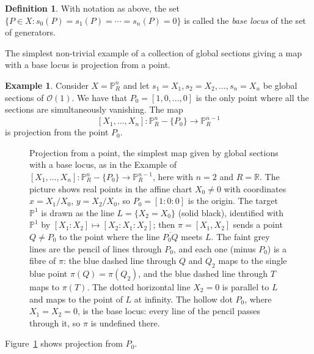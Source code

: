 \documentclass[12pt]{article}
\numberwithin{equation}{section}
\theoremstyle{definition}
\newtheorem{definition}[theorem]{Definition}
\newtheorem{example}[theorem]{Example}
\theoremstyle{remark}
\newcommand{\RR}{\mathbb{R}}
\newcommand{\Ocal}{\mathcal{O}}
\newcommand{\PP}{\mathbb{P}}
\begin{document}
\begin{definition}
	With notation as above, the set $\lbrace P \in X \colon s_0(P)=s_1(P)=\cdots =s_n(P) =0 \rbrace $ is called the \emph{base locus} of the set of generators.
\end{definition}


The simplest non-trivial example of a collection of global sections giving a map with a base locus is projection from a point. 
\begin{example}
	Consider $X = \PP^n_R$ and let $s_1 = X_1, s_2=X_2, \ldots, s_n = X_n$ be global sections of $\Ocal(1)$.
	We have that $P_0 = [1,0,\ldots,0]$ is the only point where all the sections are simultaneously vanishing. 
	The map 
	$$ [X_1,\ldots,X_n] \colon \PP^n_R - \lbrace P_0 \rbrace \to \PP^{n-1}_R $$
	is projection from the point $P_0$.
\end{example}
\begin{figure}[H]
\centering

\caption{Projection from a point, the simplest map given by global sections with a base locus, as in the Example of $[X_1,\ldots,X_n]\colon\PP^n_R-\{P_0\}\to\PP^{n-1}_R$, here with $n=2$ and $R=\RR$. The picture shows real points in the affine chart $X_0\neq0$ with coordinates $x=X_1/X_0$, $y=X_2/X_0$, so $P_0=[1{:}0{:}0]$ is the origin. The target $\PP^1$ is drawn as the line $L=\{X_2=X_0\}$ (solid black), identified with $\PP^1$ by $[X_1{:}X_2]\mapsto[X_2{:}X_1{:}X_2]$; then $\pi=[X_1,X_2]$ sends a point $Q\neq P_0$ to the point where the line $\overline{P_0Q}$ meets $L$. The faint grey lines are the pencil of lines through $P_0$, and each one (minus $P_0$) is a fibre of $\pi$: the blue dashed line through $Q$ and $Q_2$ maps to the single blue point $\pi(Q)=\pi(Q_2)$, and the blue dashed line through $T$ maps to $\pi(T)$. The dotted horizontal line $X_2=0$ is parallel to $L$ and maps to the point of $L$ at infinity. The hollow dot $P_0$, where $X_1=X_2=0$, is the base locus: every line of the pencil passes through it, so $\pi$ is undefined there.}\label{fig:projection-from-point}
\end{figure}
Figure~\ref{fig:projection-from-point} shows projection from $P_0$.
\end{document}
